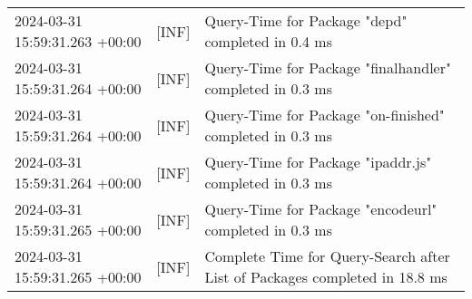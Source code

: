 {{\begin{tabularx}{\textwidth}{|l|l|X|}
                    2024-03-31 15:59:31.263 +00:00 & [INF] & Query-Time for Package "depd" completed in 0.4 ms \\
                    2024-03-31 15:59:31.264 +00:00 & [INF] & Query-Time for Package "finalhandler" completed in 0.3 ms \\
                    2024-03-31 15:59:31.264 +00:00 & [INF] & Query-Time for Package "on-finished" completed in 0.3 ms \\
                    2024-03-31 15:59:31.264 +00:00 & [INF] & Query-Time for Package "ipaddr.js" completed in 0.3 ms \\
                    2024-03-31 15:59:31.265 +00:00 & [INF] & Query-Time for Package "encodeurl" completed in 0.3 ms \\
                    2024-03-31 15:59:31.265 +00:00 & [INF] & Complete Time for Query-Search after List of Packages completed in 18.8 ms \\
                    \hline
                \end{tabularx}
            }
        }

